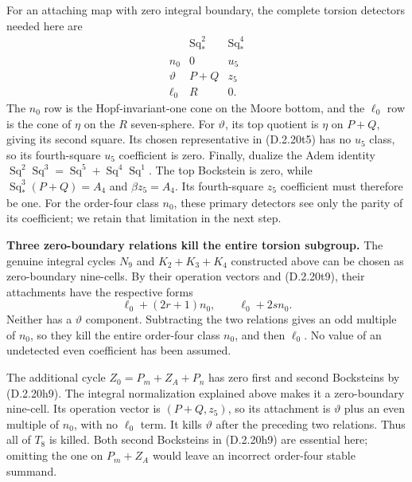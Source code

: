 For an attaching map with zero integral boundary, the complete
torsion detectors needed here are
\[
\begin{array}{c|c|c}
 &\operatorname{Sq}_*^2&\operatorname{Sq}_*^4\\ \hline
 n_0&0&u_5\\
 \vartheta&P+Q&z_5\\
 \ell_0&R&0.
\end{array}
 \tag{D.2.20t9}
\]
The $n_0$ row is the Hopf-invariant-one cone on the
Moore bottom, and the $\ell_0$ row is the cone of $\eta$
on the $R$ seven-sphere. For $\vartheta$, its top quotient
is $\eta$ on $P+Q$, giving its second square. Its chosen
representative in \textup{(D.2.20t5)} has no $u_5$ class,
so its fourth-square $u_5$ coefficient is zero. Finally,
dualize the Adem identity
$\operatorname{Sq}^2\operatorname{Sq}^3
=\operatorname{Sq}^5+\operatorname{Sq}^4\operatorname{Sq}^1$.
The top Bockstein is zero, while
$\operatorname{Sq}_*^3(P+Q)=A_4$ and $\beta z_5=A_4$.
Its fourth-square $z_5$ coefficient must therefore be one.
For the order-four class $n_0$, these primary detectors
see only the parity of its coefficient; we retain that
limitation in the next step.

\medskip\noindent
\textbf{Three zero-boundary relations kill the entire torsion subgroup.}
The genuine integral cycles $N_9$ and $K_2+K_3+K_4$ constructed
above can be chosen as zero-boundary nine-cells. By their
operation vectors and \textup{(D.2.20t9)}, their attachments
have the respective forms
\[
 \ell_0+(2r+1)n_0,\qquad \ell_0+2s n_0.
 \tag{D.2.20t10}
\]
Neither has a $\vartheta$ component. Subtracting the two
relations gives an odd multiple of $n_0$, so they kill
the entire order-four class $n_0$, and then $\ell_0$.
No value of an undetected even coefficient has been assumed.

The additional cycle $Z_0=P_m+Z_A+P_n$ has zero first and
second Bocksteins by \textup{(D.2.20h9)}. The integral
normalization explained above makes it a zero-boundary
nine-cell. Its operation vector is $(P+Q,z_5)$, so its
attachment is $\vartheta$ plus an even multiple of $n_0$,
with no $\ell_0$ term. It kills $\vartheta$ after the
preceding two relations. Thus all of $T_8$ is killed.
Both second Bocksteins in \textup{(D.2.20h9)} are essential
here; omitting the one on $P_m+Z_A$ would leave an incorrect
order-four stable summand.


